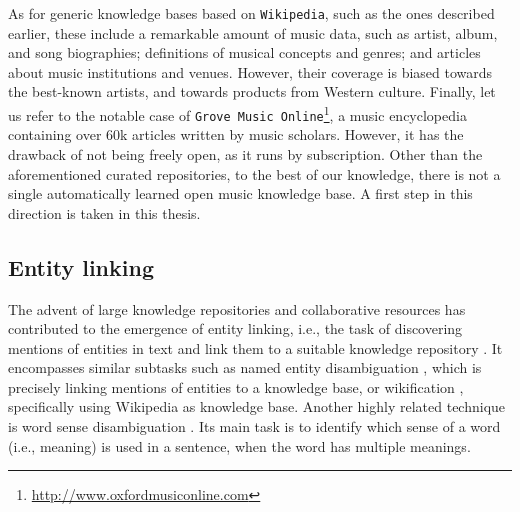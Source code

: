 As for generic knowledge bases based on \texttt{Wikipedia}, such as the ones described earlier, these include a remarkable amount of music data, such as artist, album, and song biographies; definitions of musical concepts and genres; and articles about music institutions and venues. However, their coverage is biased towards the best-known artists, and towards products from Western culture. Finally, let us refer to the notable case of \texttt{Grove Music Online}\footnote{\url{http://www.oxfordmusiconline.com}}, a music encyclopedia containing over 60k articles written by music scholars. However, it has the drawback of not being freely open, as it runs by subscription.
Other than the aforementioned curated repositories, to the best of our knowledge, there is not a single automatically learned open music knowledge base. A first step in this direction is taken in this thesis.



\subsection{Entity linking}
\label{sec:SOA:nlu:entity_linking}

The advent of large knowledge repositories and collaborative resources has contributed to the emergence of entity linking, i.e., the task of discovering mentions of entities in text and link them to a suitable knowledge repository \citep{Moroetal2014}. 
It encompasses similar subtasks such as named entity disambiguation \citep{BunescuandPasca2006}, which is precisely linking mentions of entities to a knowledge base, or wikification \citep{MihalceaandCsomai2007}, specifically using Wikipedia as knowledge base.
Another highly related technique is word sense disambiguation \citep{stevenson2003word}. Its main task is to identify which sense of a word (i.e., meaning) is used in a sentence, when the word has multiple meanings.

